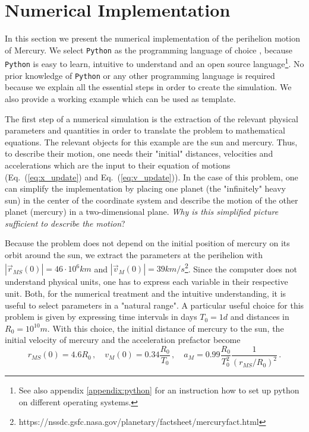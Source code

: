 \documentclass[12pt]{iopart}
\newcommand{\python}[0]{\texttt{Python} }
\newcommand{\abs}[1]{\left\vert #1 \right\vert}
\begin{document}
\section{Numerical Implementation}
In this section we present the numerical implementation of the perihelion motion of Mercury.  We select \python as the programming language of choice \cite{}, because \python is easy to learn, intuitive to understand and an open source language\footnote{See also appendix \ref{appendix:python} for an instruction how to set up python on different operating systems.}.  No prior knowledge of \python or any other programming language is required because we explain all the essential steps in order to create the simulation.  We also provide a working example \cite{} which can be used as template.

The first step of a numerical simulation is the extraction of the relevant physical parameters and quantities in order to translate the problem to mathematical equations.  The relevant objects for this example are the sun and mercury.  Thus, to describe their motion, one needs their "initial" distances, velocities and accelerations which are the input to their equation of motions (Eq.~(\ref{eq:x_update}) and Eq.~(\ref{eq:v_update})).  In the case of this problem, one can simplify the implementation by placing one planet (the "infinitely" heavy sun) in the center of the coordinate system and describe the motion of the other planet (mercury) in a two-dimensional plane.  \textit{Why is this simplified picture sufficient to describe the motion}?

Because the problem does not depend on the initial position of mercury on its orbit around the sun, we extract the parameters at the perihelion with $ \abs{\vec r_{MS}(0)} = 46 \cdot 10^6 km$ and $ \abs{\vec v_M(0)} = 39 km/s $\footnote{https://nssdc.gsfc.nasa.gov/planetary/factsheet/mercuryfact.html}.  Since the computer does not understand physical units, one has to express each variable in their respective unit.  Both, for the numerical treatment and the intuitive understanding, it is useful to select parameters in a "natural range".  A particular useful choice for this problem is given by expressing time intervals in days $T_0 = 1d$ and distances in $R_0 = 10^{10}m$.  With this choice, the initial distance of mercury to the sun, the initial velocity of mercury and the acceleration prefactor become
\begin{equation}
	r_{MS}(0) = 4.6 R_0 \, , \quad
	v_{M}(0)  = 0.34 \frac{R_0}{T_0} \, ,  \quad
	a_M       = 0.99 \frac{R_0}{T_0^2} \frac{1}{\left(r_{MS}/R_0\right)^2}
	\, .
\end{equation}
\end{document}
